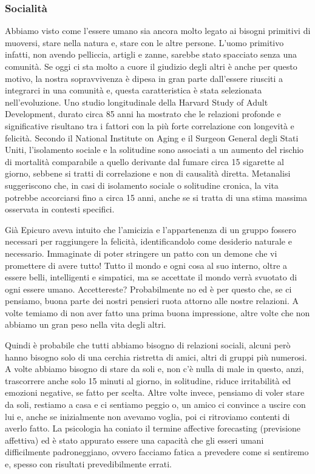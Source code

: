 \documentclass[12pt]{book} %
\begin{document}
\subsubsection{Socialità}
Abbiamo visto come l'essere umano sia ancora molto legato ai bisogni primitivi di muoversi, stare nella natura e, stare con
le altre persone. L'uomo primitivo infatti, non avendo pelliccia, artigli e zanne, sarebbe stato
spacciato senza una comunità. Se oggi ci sta molto a cuore il giudizio degli altri è anche per questo motivo, la nostra
sopravvivenza è dipesa in gran parte dall'essere riusciti a integrarci in una comunità e, questa caratteristica è stata selezionata nell'evoluzione. 
Uno studio longitudinale della Harvard Study of Adult Development, durato circa 85 anni ha mostrato che le relazioni profonde e significative risultano tra i fattori con la più forte correlazione con longevità e felicità.
Secondo il National Institute on Aging e il Surgeon General degli Stati Uniti, l’isolamento sociale e la solitudine sono associati a un aumento del rischio di mortalità comparabile a quello derivante dal fumare circa 15 sigarette al giorno, sebbene si tratti di correlazione e non di causalità diretta. Metanalisi suggeriscono che, in casi di isolamento sociale o solitudine cronica, la vita potrebbe accorciarsi fino a circa 15 anni, anche se si tratta di una stima massima osservata in contesti specifici.

Già Epicuro aveva intuito che l'amicizia e l'appartenenza di un gruppo fossero
necessari per raggiungere la felicità, identificandolo come desiderio naturale e necessario. 
Immaginate di poter stringere un patto con un demone che vi promettere di avere tutto! Tutto il mondo e ogni cosa al suo interno,
oltre a essere belli, intelligenti e simpatici, ma se accettate il mondo verrà svuotato di ogni essere umano.
Accettereste? Probabilmente no ed è per questo che, se ci pensiamo, buona parte dei nostri pensieri ruota attorno alle nostre relazioni.
A volte temiamo di non aver fatto una prima buona impressione, altre volte che non abbiamo un gran peso nella vita
degli altri.

Quindi è probabile che tutti abbiamo bisogno di relazioni sociali, alcuni però hanno bisogno solo di una cerchia ristretta di amici,
altri di gruppi più numerosi. A volte abbiamo bisogno di stare da
soli e, non c'è nulla di male in questo, anzi, trascorrere anche solo
15 minuti al giorno, in solitudine, riduce irritabilità ed emozioni negative, se fatto per scelta. Altre volte invece,
pensiamo di voler stare da soli, restiamo a casa e ci sentiamo peggio o, un amico ci convince a uscire con lui e, anche
se inizialmente non avevamo voglia, poi ci ritroviamo contenti di averlo fatto. La psicologia ha coniato il termine affective
forecasting (previsione affettiva) ed è stato appurato essere una capacità che gli esseri umani difficilmente
padroneggiano, ovvero facciamo fatica a prevedere come si sentiremo e, spesso con risultati prevedibilmente errati.
\end{document}
